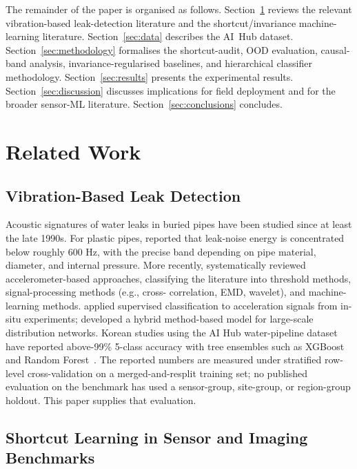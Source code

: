 \documentclass[sensors,article,submit,pdftex,oneauthor]{Definitions/mdpi}
\begin{document}
The remainder of the paper is organised as follows.
Section~\ref{sec:related} reviews the relevant vibration-based
leak-detection literature and the shortcut/invariance
machine-learning literature. Section~\ref{sec:data} describes
the AI~Hub dataset. Section~\ref{sec:methodology} formalises
the shortcut-audit, OOD evaluation, causal-band analysis,
invariance-regularised baselines, and hierarchical classifier
methodology. Section~\ref{sec:results} presents the experimental
results. Section~\ref{sec:discussion} discusses implications
for field deployment and for the broader sensor-ML literature.
Section~\ref{sec:conclusions} concludes.

\section{Related Work}\label{sec:related}

\subsection{Vibration-Based Leak Detection}

Acoustic signatures of water leaks in buried pipes have been
studied since at least the late 1990s. For plastic pipes,
\citet{hunaidi2000plastic} reported that leak-noise energy is
concentrated below roughly 600 Hz, with the precise band
depending on pipe material, diameter, and internal pressure.
More recently, \citet{ismail2019review} systematically reviewed
accelerometer-based approaches, classifying the literature into
threshold methods, signal-processing methods (e.g., cross-
correlation, EMD, wavelet), and machine-learning methods.
\citet{shukla2020leakage} applied supervised classification to
acceleration signals from in-situ experiments;
\citet{fereidooni2021hybrid} developed a hybrid method-based
model for large-scale distribution networks. Korean studies
using the AI Hub water-pipeline dataset have reported
above-99\% 5-class accuracy with tree ensembles such as
XGBoost~\cite{chen2016xgboost} and Random
Forest~\cite{breiman2001rf,lee2023leak}. The reported numbers
are measured under stratified row-level cross-validation on a
merged-and-resplit training set; no published evaluation on the
benchmark has used a sensor-group, site-group, or region-group
holdout. This paper supplies that evaluation.

\subsection{Shortcut Learning in Sensor and Imaging Benchmarks}
\end{document}
